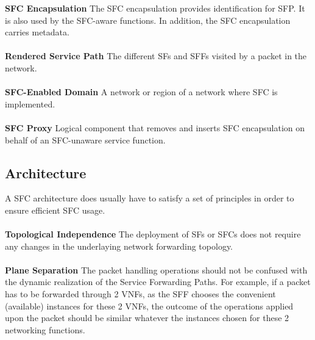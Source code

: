 \textbf{SFC Encapsulation} The SFC encapsulation  provides identification for SFP. It is also used by the SFC-aware functions. In addition, the SFC encapsulation carries metadata.\\
\\
\textbf{Rendered Service Path}  The different SFs and SFFs visited by a packet in the network.\\
\\
\textbf{SFC-Enabled Domain} A network or region of a network where SFC is implemented.\\
\\
\textbf{SFC Proxy} Logical component that removes and inserts SFC encapsulation on behalf of an     SFC-unaware service function.
\subsection{Architecture}
\vspace*{0.5cm}
A SFC architecture does usually have to satisfy a set of principles in order to ensure efficient SFC usage.\\
\\
\textbf{Topological Independence} 
The deployment of SFs or SFCs does not require any changes in the underlaying network forwarding topology.\\
\\
\textbf{Plane Separation} The packet handling operations should not be confused with the dynamic realization of the Service Forwarding Paths. For example, if a packet has to be forwarded through 2 VNFs, as the SFF chooses the convenient (available) instances for these 2 VNFs, the outcome of the operations applied upon the packet should be similar whatever the instances chosen for these 2 networking functions.

